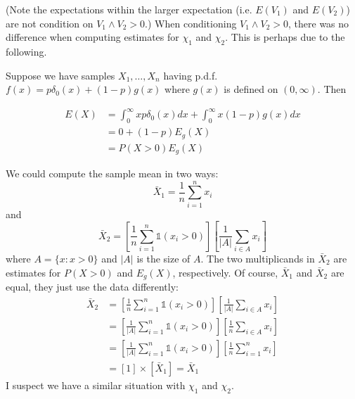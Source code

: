 \documentclass[12pt]{article}
\newcommand{\ind}{\mathds{1}}
\begin{document}
(Note the expectations within the larger expectation (i.e. $E(V_1)$ and $E(V_2)$) are not condition on $V_1 \wedge V_2 > 0$.) When conditioning $V_1 \wedge V_2 > 0$, there was no difference when computing estimates for $\chi_1$ and $\chi_2$. This is perhaps due to the following.
\bigskip

Suppose we have samples $X_1,\ldots,X_n$ having p.d.f. $f(x) = p\delta_0(x) + (1-p)g(x)$ where $g(x)$ is defined on $(0, \infty)$. Then

\begin{align*}
E(X) &= \int_0^\infty x p \delta_0(x) dx + \int_0^\infty x (1-p) g(x) dx \\
&= 0 + (1-p)E_g(X) \\
&= P(X > 0)E_g(X) 
\end{align*}

We could compute the sample mean in two ways:
\[ \bar{X}_1 = \frac{1}{n}\sum_{i=1}^n x_i \]
and
\[ \bar{X}_2 = \left[\frac{1}{n}\sum_{i=1}^n \ind(x_i > 0)\right] \left[\frac{1}{|A|}\sum_{i\in A} x_i\right] \]
where $A=\{x : x > 0\}$ and $|A|$ is the size of $A$. The two multiplicands in $\bar{X}_2$ are estimates for $P(X>0)$ and $E_g(X)$, respectively. Of course, $\bar{X}_1$ and $\bar{X}_2$ are equal, they just use the data differently:
\begin{align*}
\bar{X}_2 &= \left[\frac{1}{n}\sum_{i=1}^n \ind(x_i > 0)\right] \left[\frac{1}{|A|}\sum_{i\in A} x_i\right]  \\
&= \left[\frac{1}{|A|}\sum_{i=1}^n \ind(x_i > 0)\right] \left[\frac{1}{n}\sum_{i\in A} x_i\right]  \\
&= \left[\frac{1}{|A|}\sum_{i=1}^n \ind(x_i > 0)\right] \left[\frac{1}{n}\sum_{i=1}^n x_i\right]  \\
&= \left[1\right] \times \left[\bar{X}_1\right] = \bar{X}_1
\end{align*}
I suspect we have a similar situation with $\chi_1$ and $\chi_2$.
\end{document}
